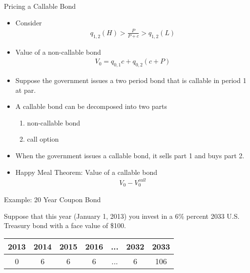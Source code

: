 \documentclass[professionalfonts,small]{beamer}
\begin{document}
\begin{frame}{Pricing a Callable Bond}
\footnotesize

\begin{itemize}

\item Consider
\begin{eqnarray*}
q_{1,2}(H)  > \frac{P}{P+c} > q_{1,2}(L)
\end{eqnarray*}

\item Value of a non-callable bond
\begin{eqnarray*}
V_0 = q_{0,1} c + q_{0,2}(c+P)
\end{eqnarray*}

\item Suppose the government issues a two period bond that is callable in period 1 at par.

\item A callable bond can be decomposed into two parts
\begin{enumerate}
\footnotesize
\item non-callable bond
\item call option
\end{enumerate}

\item When the government issues a callable bond, it sells part 1 and buys part 2.

\item Happy Meal Theorem:  Value of a callable bond
\begin{eqnarray*}
V_0 - V_0^{call}
\end{eqnarray*}

\end{itemize}

\end{frame}

\begin{frame}{Example: 20 Year Coupon Bond}

Suppose that this year (January 1, 2013) you invest in a 6\% percent 2033 U.S. Treasury bond with a
face value of \$100.

\begin{center}
\begin{tabular}{ccccccc}
  2013    &   2014   &  2015  &  2016   & ...  & 2032  & 2033\\
\hline
   0      &    6    &   6   &   6    &  ... & 6    & 106 \\
\hline
\end{tabular}
\end{center}

\end{frame}
\end{document}
